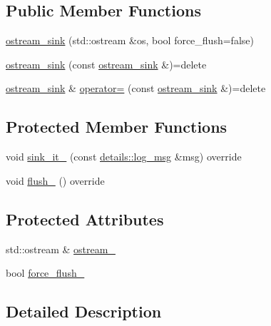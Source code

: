 \subsection*{Public Member Functions}
\begin{DoxyCompactItemize}
\item 
\hyperlink{classspdlog_1_1sinks_1_1ostream__sink_aa038c6518dc69c08a1251e7469bc4fd8}{ostream\+\_\+sink} (std\+::ostream \&os, bool force\+\_\+flush=false)
\item 
\hyperlink{classspdlog_1_1sinks_1_1ostream__sink_a761f1c26210fe42673af4734b38fe167}{ostream\+\_\+sink} (const \hyperlink{classspdlog_1_1sinks_1_1ostream__sink}{ostream\+\_\+sink} \&)=delete
\item 
\hyperlink{classspdlog_1_1sinks_1_1ostream__sink}{ostream\+\_\+sink} \& \hyperlink{classspdlog_1_1sinks_1_1ostream__sink_a727591b2a4ca044848cacccfca4eb3af}{operator=} (const \hyperlink{classspdlog_1_1sinks_1_1ostream__sink}{ostream\+\_\+sink} \&)=delete
\end{DoxyCompactItemize}
\subsection*{Protected Member Functions}
\begin{DoxyCompactItemize}
\item 
void \hyperlink{classspdlog_1_1sinks_1_1ostream__sink_a77f36cef81daf668ec55a07fa191d1e7}{sink\+\_\+it\+\_\+} (const \hyperlink{structspdlog_1_1details_1_1log__msg}{details\+::log\+\_\+msg} \&msg) override
\item 
void \hyperlink{classspdlog_1_1sinks_1_1ostream__sink_a96458aa6b79019744ef4cb61979c39e0}{flush\+\_\+} () override
\end{DoxyCompactItemize}
\subsection*{Protected Attributes}
\begin{DoxyCompactItemize}
\item 
std\+::ostream \& \hyperlink{classspdlog_1_1sinks_1_1ostream__sink_a53db4ea84203737b100365438d1951b4}{ostream\+\_\+}
\item 
bool \hyperlink{classspdlog_1_1sinks_1_1ostream__sink_a5778019dfdf7dc09ea798c490810eaed}{force\+\_\+flush\+\_\+}
\end{DoxyCompactItemize}


\subsection{Detailed Description}
